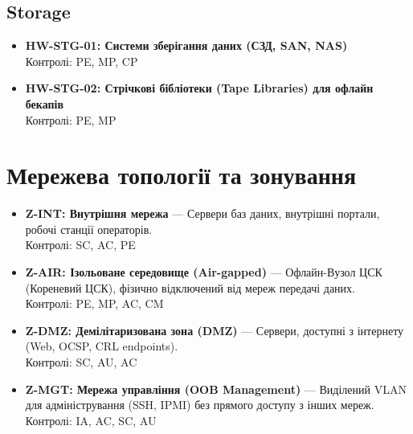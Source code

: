 \documentclass{article}
\begin{document}
\subsection{Storage}
\begin{itemize}
\item \textbf{HW-STG-01: Системи зберігання даних (СЗД, SAN, NAS)}
\\ Контролі: PE, MP, CP
\item \textbf{HW-STG-02: Стрічкові бібліотеки (Tape Libraries) для офлайн бекапів}
\\ Контролі: PE, MP
\end{itemize}


\newpage
\section{Мережева топології та зонування}
\begin{itemize}
\item \textbf{Z-INT: Внутрішня мережа} — Сервери баз даних, внутрішні портали, робочі станції операторів.
\\ Контролі: SC, AC, PE
\item \textbf{Z-AIR: Ізольоване середовище (Air-gapped)} — Офлайн-Вузол ЦСК (Кореневий ЦСК), фізично відключений від мереж передачі даних.
\\ Контролі: PE, MP, AC, CM
\item \textbf{Z-DMZ: Демілітаризована зона (DMZ)} — Сервери, доступні з інтернету (Web, OCSP, CRL endpoints).
\\ Контролі: SC, AU, AC
\item \textbf{Z-MGT: Мережа управління (OOB Management)} — Виділений VLAN для адміністрування (SSH, IPMI) без прямого доступу з інших мереж.
\\ Контролі: IA, AC, SC, AU
\end{itemize}


\newpage
\end{document}
